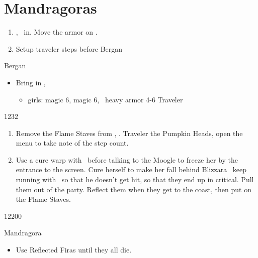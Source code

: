 \chapter{Mandragoras}

\begin{enumerate}
\item \basch, \balthier\ in. Move the armor on \basch.
\item Setup traveler steps before Bergan
\end{enumerate}
\begin{battle}{Bergan}
\begin{itemize}
\vaanf Run up to Bergan
\item Bring in \ashe, \penelo
\begin{liscense}
\begin{itemize}
\item girls: magic 6, magic 6, \vaan\ heavy armor 4-6
\vaanf Traveler
\end{itemize}
\end{liscense}
\end{itemize}
\end{battle}
\begin{shop}{1232}
\end{shop}
\begin{enumerate}
\item Remove the Flame Staves from \ashe, \penelo.
\vaanf Traveler the Pumpkin Heads, open the menu to take note of the step count.
\item Use a cure warp with \ashe\ before talking to the Moogle to freeze her by the entrance to the screen.
\ashef Cure herself to make her fall behind
\penelof Blizzara \ashe\, keep running with \vaan\ so that he doesn't get hit, so that they end up in critical. Pull them out of the party. Reflect them when they get to the coast, then put on the Flame Staves.
\end{enumerate}
\begin{shop}{12200}
\end{shop}
\begin{battle}{Mandragora}
\begin{itemize}
\vaanf Wait for them to gather up, then Traveler them.
\item Use Reflected Firas until they all die.
\end{itemize}
\end{battle}